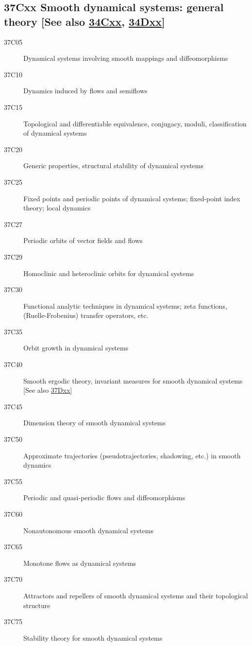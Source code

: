 \subsection*{37Cxx  Smooth dynamical systems: general theory [See also \hyperref[34Cxx]{34Cxx}, \hyperref[34Dxx]{34Dxx}] }\label{37Cxx}
\begin{description}  
\item [37C05]\label{37C05} Dynamical systems involving smooth mappings and diffeomorphisms
\item [37C10]\label{37C10} Dynamics induced by flows and semiflows
\item [37C15]\label{37C15} Topological and differentiable equivalence, conjugacy,  moduli, classification of dynamical systems
\item [37C20]\label{37C20} Generic properties, structural stability of dynamical systems
\item [37C25]\label{37C25} Fixed points and periodic points of dynamical systems; fixed-point index theory; local dynamics
\item [37C27]\label{37C27} Periodic orbits of vector fields and flows
\item [37C29]\label{37C29} Homoclinic and heteroclinic orbits for dynamical systems
\item [37C30]\label{37C30} Functional analytic techniques in dynamical systems; zeta functions, (Ruelle-Frobenius) transfer operators, etc. 
\item [37C35]\label{37C35} Orbit growth in dynamical systems
\item [37C40]\label{37C40} Smooth ergodic theory, invariant measures for smooth dynamical systems [See also \hyperref[37Dxx]{37Dxx}]
\item [37C45]\label{37C45} Dimension theory of smooth dynamical systems
\item [37C50]\label{37C50} Approximate trajectories (pseudotrajectories, shadowing, etc.) in smooth dynamics 
\item [37C55]\label{37C55} Periodic and quasi-periodic flows and diffeomorphisms 
\item [37C60]\label{37C60} Nonautonomous smooth dynamical systems
\item [37C65]\label{37C65} Monotone flows as dynamical systems
\item [37C70]\label{37C70} Attractors and repellers of smooth dynamical systems and their topological structure 
\item [37C75]\label{37C75} Stability theory for smooth dynamical systems

\end{description}
